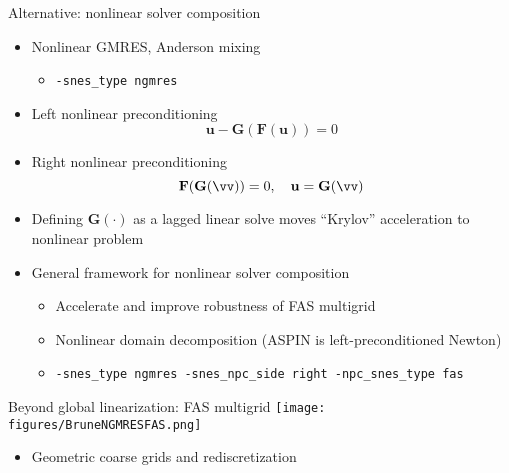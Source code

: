 \documentclass{beamer}
\newcommand{\vu}{\mathbf{u}}
\newcommand{\vF}{\mathbf{F}}
\newcommand{\vG}{\mathbf{G}}
\begin{document}
\begin{frame}{Alternative: nonlinear solver composition}
  \begin{itemize}
  \item Nonlinear GMRES, Anderson mixing
    \begin{itemize}
    \item \texttt{-snes\_type ngmres}
    \end{itemize}
  \item Left nonlinear preconditioning
    \begin{equation*}
      \vu - \vG(\vF(\vu)) = 0
    \end{equation*}
  \item Right nonlinear preconditioning
    \begin{equation*}
      \vF(\vG(\vv)) = 0, \quad \vu = \vG(\vv)
    \end{equation*}
  \item Defining $\vG(\cdot)$ as a lagged linear solve moves ``Krylov'' acceleration to nonlinear problem
  \item General framework for nonlinear solver composition
    \begin{itemize}
    \item Accelerate and improve robustness of FAS multigrid
    \item Nonlinear domain decomposition (ASPIN is left-preconditioned Newton)
    \item \texttt{-snes\_type ngmres -snes\_npc\_side right -npc\_snes\_type fas}
    \end{itemize}
  \end{itemize}
\end{frame}

\begin{frame}{Beyond global linearization: FAS multigrid}
  \texttt{[image: figures/BruneNGMRESFAS.png]}
  \begin{itemize}
  \item Geometric coarse grids and rediscretization
  \end{itemize}
\end{frame}
\end{document}
